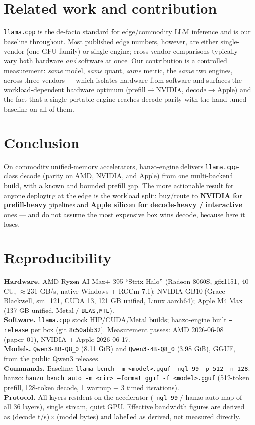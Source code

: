 \documentclass[11pt]{article}
\begin{document}
\section{Related work and contribution}
\texttt{llama.cpp} is the de-facto standard for edge/commodity LLM inference and is our baseline
throughout. Most published edge numbers, however, are either single-vendor (one GPU family) or
single-engine; cross-vendor comparisons typically vary both hardware \emph{and} software at once.
Our contribution is a controlled measurement: \emph{same} model, \emph{same} quant, \emph{same}
metric, the \emph{same} two engines, across three vendors --- which isolates hardware from software
and surfaces the workload-dependent hardware optimum (prefill$\to$NVIDIA, decode$\to$Apple) and the
fact that a single portable engine reaches decode parity with the hand-tuned baseline on all of them.

\section{Conclusion}
On commodity unified-memory accelerators, hanzo-engine delivers \texttt{llama.cpp}-class decode
(parity on AMD, NVIDIA, and Apple) from one multi-backend build, with a known and bounded prefill
gap. The more actionable result for anyone deploying at the edge is the workload split: buy/route
to \textbf{NVIDIA for prefill-heavy} pipelines and \textbf{Apple silicon for decode-heavy /
interactive} ones --- and do not assume the most expensive box wins decode, because here it loses.

\appendix
\section{Reproducibility}
\textbf{Hardware.} AMD Ryzen AI Max+ 395 ``Strix Halo'' (Radeon 8060S, gfx1151, 40 CU, $\approx$231 GB/s,
native Windows + ROCm 7.1); NVIDIA GB10 (Grace-Blackwell, sm\_121, CUDA 13, 121 GB unified, Linux
aarch64); Apple M4 Max (137 GB unified, Metal / \texttt{BLAS,MTL}).\\
\textbf{Software.} \texttt{llama.cpp} stock HIP/CUDA/Metal builds; hanzo-engine built \texttt{--release}
per box (git \texttt{8c50abb32}). Measurement passes: AMD 2026-06-08 (paper~01), NVIDIA + Apple 2026-06-17.\\
\textbf{Models.} \texttt{Qwen3-8B-Q8\_0} (8.11 GiB) and \texttt{Qwen3-4B-Q8\_0} (3.98 GiB), GGUF, from the
public Qwen3 releases.\\
\textbf{Commands.} Baseline: \texttt{llama-bench -m <model>.gguf -ngl 99 -p 512 -n 128}. hanzo:
\texttt{hanzo bench auto -m <dir> --format gguf -f <model>.gguf} (512-token prefill, 128-token decode,
1 warmup + 3 timed iterations).\\
\textbf{Protocol.} All layers resident on the accelerator (\texttt{-ngl 99} / hanzo auto-map of all 36
layers), single stream, quiet GPU. Effective bandwidth figures are derived as (decode t/s)\,$\times$\,(model
bytes) and labelled as derived, not measured directly.
\end{document}
